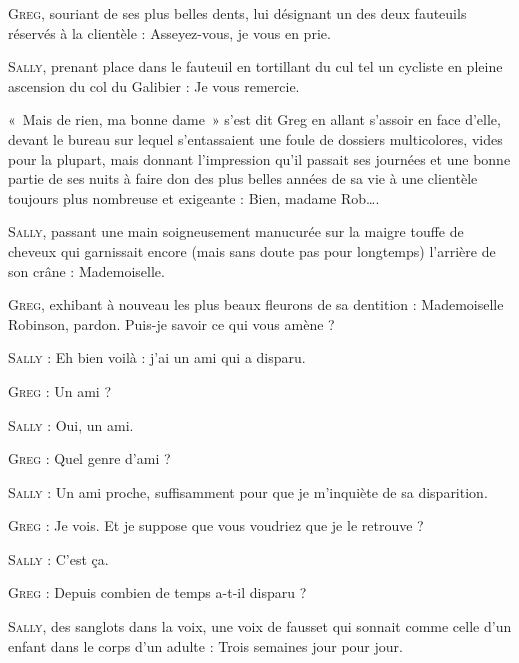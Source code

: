 \begin{dialogue}

\textsc{Greg}, souriant de ses plus belles dents, lui désignant un des deux fauteuils réservés à la clientèle : Asseyez-vous, je vous en prie.

%
%
%
\textsc{Sally}, prenant place dans le fauteuil en tortillant du cul tel un cycliste en pleine ascension du col du Galibier : Je vous remercie.

«~Mais de rien, ma bonne dame~» s’est dit Greg en allant s’assoir en face d’elle, devant le bureau sur lequel s’entassaient une foule de dossiers multicolores, vides pour la plupart, mais donnant l’impression qu’il passait ses journées et une bonne partie de ses nuits à faire don des plus belles années de sa vie à une clientèle toujours plus nombreuse et exigeante : Bien, madame Rob….

\textsc{Sally}, passant une main soigneusement manucurée sur la maigre touffe de cheveux qui garnissait encore (mais sans doute pas pour longtemps) l’arrière de son crâne : Mademoiselle.

\textsc{Greg}, exhibant à nouveau les plus beaux fleurons de sa dentition : Mademoiselle Robinson, pardon. Puis-je savoir ce qui vous amène ?

\textsc{Sally} : Eh bien voilà : j’ai un ami qui a disparu.

\textsc{Greg} : Un ami ?

\textsc{Sally} : Oui, un ami.

\textsc{Greg} : Quel genre d’ami ?

\textsc{Sally} : Un ami proche, suffisamment pour que je m’inquiète de sa disparition.

\textsc{Greg} : Je vois. Et je suppose que vous voudriez que je le retrouve ?

\textsc{Sally} : C’est ça.

\textsc{Greg} : Depuis combien de temps a-t-il disparu ?

\textsc{Sally}, des sanglots dans la voix, une voix de fausset qui sonnait comme celle d’un enfant dans le corps d’un adulte : Trois semaines jour pour jour.


\end{dialogue}
